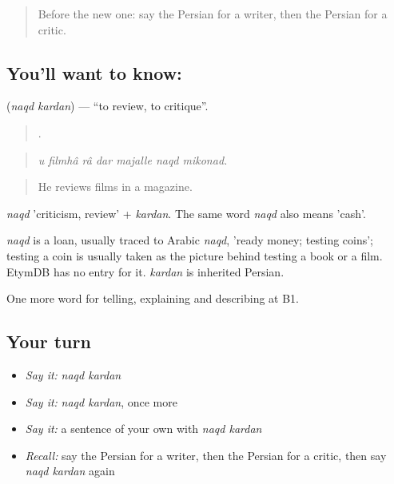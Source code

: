 \label{lesson:FA-C529-naqd-kardan}



\begin{quote}
Before the new one: say the Persian for a writer, then the Persian for a critic.
\end{quote}

\subsection*{You'll want to know:  }
\textbf{ } (\emph{naqd kardan}) — \textquotedblleft{}to review, to critique\textquotedblright{}.

\begin{quote}
      .
\end{quote}

\begin{quote}
\emph{u filmhâ râ dar majalle naqd mikonad.}
\end{quote}

\begin{quote}
He reviews films in a magazine.
\end{quote}

\emph{naqd} 'criticism, review' + \emph{kardan}. The same word \emph{naqd} also means 'cash'.

\begin{cousinweb}
\emph{naqd} is a loan, usually traced to Arabic \emph{naqd}, 'ready money; testing coins'; testing a coin is usually taken as the picture behind testing a book or a film. EtymDB has no entry for it. \emph{kardan} is inherited Persian.
\end{cousinweb}

\begin{grammarlens}[title={What you've built}]
One more word for telling, explaining and describing at B1.
\end{grammarlens}

\subsection*{Your turn}
\begin{itemize}
\raggedright
  \item \emph{Say it:} \emph{naqd kardan}
  \item \emph{Say it:} \emph{naqd kardan}, once more
  \item \emph{Say it:} a sentence of your own with \emph{naqd kardan}
  \item \emph{Recall:} say the Persian for a writer, then the Persian for a critic, then say \emph{naqd kardan} again
\end{itemize}

